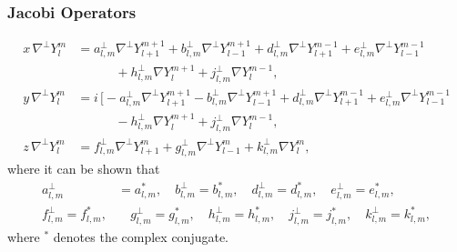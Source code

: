 \documentclass[10pt]{beamer}
\newcommand{\gradY}{\nabla Y}
\newcommand{\gradpY}{\nabla^\perp Y}
\newcommand{\gradpYlm}{\nabla^\perp Y^m_l}
\newcommand{\alm}{a_{l,m}}
\newcommand{\blm}{b_{l,m}}
\newcommand{\dlm}{d_{l,m}}
\newcommand{\elm}{e_{l,m}}
\newcommand{\flm}{f_{l,m}}
\newcommand{\glm}{g_{l,m}}
\newcommand{\hlm}{h_{l,m}}
\newcommand{\jlm}{j_{l,m}}
\newcommand{\klm}{k_{l,m}}
\newcommand{\almperp}{a_{l,m}^\perp}
\newcommand{\blmperp}{b_{l,m}^\perp}
\newcommand{\dlmperp}{d_{l,m}^\perp}
\newcommand{\elmperp}{e_{l,m}^\perp}
\newcommand{\flmperp}{f_{l,m}^\perp}
\newcommand{\glmperp}{g_{l,m}^\perp}
\newcommand{\hlmperp}{h_{l,m}^\perp}
\newcommand{\jlmperp}{j_{l,m}^\perp}
\newcommand{\klmperp}{k_{l,m}^\perp}
\begin{document}
\frame
{
    \frametitle{Jacobi Operators}

\begin{align}
x \,\gradpYlm &= \almperp \gradpY^{m+1}_{l+1} + \blmperp \gradpY^{m+1}_{l-1} + \dlmperp \gradpY^{m-1}_{l+1} + \elmperp \gradpY^{m-1}_{l-1} \nonumber \\
& \quad \quad \quad + \hlmperp \gradY^{m+1}_{l} + \jlmperp \gradY^{m-1}_{l}, \\
y \,\gradpYlm &= i \, \Big[ -\almperp \gradpY^{m+1}_{l+1} - \blmperp \gradpY^{m+1}_{l-1} + \dlmperp \gradpY^{m-1}_{l+1} + \elmperp \gradpY^{m-1}_{l-1} \nonumber \\
& \quad \quad \quad - \hlmperp \gradY^{m+1}_{l} + \jlmperp \gradY^{m-1}_{l}, \\
z \,\gradpYlm &= \flmperp \gradpY^{m}_{l+1} + \glmperp \gradpY^{m}_{l-1} + \klmperp \gradY^{m}_{l},
\end{align}
where it can be shown that
\begin{align}
\almperp &= \alm^*, \quad \blmperp = \blm^*, \quad \dlmperp = \dlm^*, \quad \elmperp = \elm^*, \nonumber \\
\flmperp = \flm^*,& \quad \glmperp = \glm^*, \quad \hlmperp = \hlm^*, \quad \jlmperp = \jlm^*, \quad \klmperp = \klm^*,
\end{align}
where \(^*\) denotes the complex conjugate.

}
\end{document}
